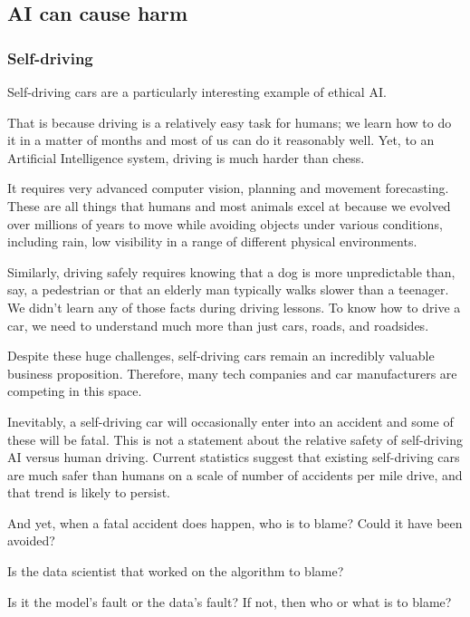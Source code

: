 \documentclass[
]{book}
\theoremstyle{definition}
\theoremstyle{definition}
\theoremstyle{definition}
\theoremstyle{definition}
\theoremstyle{remark}
\begin{document}
\hypertarget{ai-can-cause-harm}{%
\subsection{AI can cause harm}\label{ai-can-cause-harm}}

\hypertarget{self-driving}{%
\subsubsection{Self-driving}\label{self-driving}}

Self-driving cars are a particularly interesting example of ethical AI.

That is because driving is a relatively easy task for humans; we learn how to do it in a matter of months and most of us can do it reasonably well. Yet, to an Artificial Intelligence system, driving is much harder than chess.

It requires very advanced computer vision, planning and movement forecasting.
These are all things that humans and most animals excel at because we evolved
over millions of years to move while avoiding objects under various conditions,
including rain, low visibility in a range of different physical environments.

Similarly, driving safely requires knowing that a dog is more unpredictable than,
say, a pedestrian or that an elderly man typically walks slower than a teenager. We didn't learn any of those facts during driving lessons. To know how to drive
a car, we need to understand much more than just cars, roads, and roadsides.

Despite these huge challenges, self-driving cars remain an incredibly valuable business proposition. Therefore, many tech companies and car manufacturers are competing in this space.

Inevitably, a self-driving car will occasionally enter into an accident and
some of these will be fatal. This is not a statement about the relative
safety of self-driving AI versus human driving. Current statistics suggest that
existing self-driving cars are much safer than humans on a scale of number of accidents per mile drive, and that trend is likely to persist.

And yet, when a fatal accident does happen, who is to blame? Could it have been avoided?

Is the data scientist that worked on the algorithm to blame?

Is it the model's fault or the data's fault? If not, then who or what is to blame?
\end{document}
